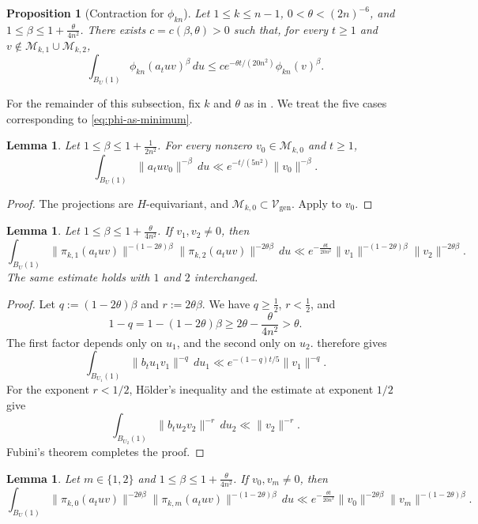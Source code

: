\documentclass[reqno,11pt]{amsart}
\numberwithin{equation}{section}
\newtheorem{lemma}[theorem]{Lemma}
\newtheorem{proposition}[theorem]{Proposition}
\theoremstyle{definition}
\theoremstyle{remark}
\newcommand{\op}{\operatorname}
\begin{document}
\begin{proposition}[Contraction for $\phi_{kn}$]
\label{prop:localMargulisineq;n-1}
Let $1\le k\le n-1$, $0<\theta<(2n)^{-6}$, and
$1\le\beta\le1+\frac{\theta}{4n^2}$.
There exists $c=c(\beta,\theta)>0$ such that, for every
$t\ge1$ and 
$v\notin\mathcal M_{k,1}\cup\mathcal M_{k,2}$,
$$
\int_{B_{U}(1)}\phi_{kn}(a_tuv)^\beta\,du
\le c e^{-\theta t/(20n^2)}\phi_{kn}(v)^\beta.
$$
\end{proposition}
 For the remainder of this subsection, fix $k$ and $\theta$ as in . We treat the five cases corresponding to
\eqref{eq:phi-as-minimum}.
\begin{lemma}
\label{lem:pi0pi0case}
Let $1\le\beta\le1+\frac1{2n^2}$. For every nonzero
$v_0\in\mathcal M_{k,0}$ and $t\ge1$,
$$
\int_{B_U(1)}\|a_tuv_0\|^{-\beta}\,du
\ll e^{-t/(5n^2)}\|v_0\|^{-\beta}.
$$
\end{lemma}

\begin{proof}
The projections are $H$-equivariant, and
$\mathcal M_{k,0}\subset\mathcal V_{\op{gen}}$. Apply
 to $v_0$.
\end{proof}

\begin{lemma}
\label{lem:pi1pi2case;n-1}
Let $1\le\beta\le1+\frac{\theta}{4n^2}$.
If $v_1,v_2\ne0$, then
$$
\int_{B_{U}(1)}
\|\pi_{k,1}(a_tuv)\|^{-(1-2\theta)\beta}
\|\pi_{k,2}(a_tuv)\|^{-2\theta\beta}\,du
\ll e^{-\frac{\theta t}{20n^2}}\|v_1\|^{-(1-2\theta)\beta}\|v_2\|^{-2\theta\beta}.
$$
The same estimate holds with $1$ and $2$ interchanged.
\end{lemma}

\begin{proof} Let
$q:=(1-2\theta)\beta$ and $r:=2\theta\beta$.
We have $q\ge\frac12$, $r<\frac12$, and
$$
1-q
=1-(1-2\theta)\beta
\ge 2\theta-\frac{\theta}{4n^2}
>\theta.
$$
The first factor depends only on $u_1$, and the second only on $u_2$.
 therefore gives
$$
\int_{B_{U_1}(1)}\|b_tu_1v_1\|^{-q}\,du_1
\ll e^{-(1-q)t /5}\|v_1\|^{-q}.
$$
For the exponent $r<1/2$, H\"older's inequality and the estimate at
exponent $1/2$ give
$$
\int_{B_{U_2}(1)}\|b_tu_2v_2\|^{-r}\,du_2
\ll\|v_2\|^{-r}.
$$
Fubini's theorem completes the proof.
\end{proof}

\begin{lemma}
\label{lem:pi0pi1case;n-1}
Let $m\in\{1,2\}$ and
$1\le\beta\le1+\frac{\theta}{4n^2}$.
If $v_0,v_m\ne0$, then
$$
\int_{B_{U}(1)}
\|\pi_{k,0}(a_tuv)\|^{-2\theta\beta}
\|\pi_{k,m}(a_tuv)\|^{-(1-2\theta)\beta}\,du
\ll e^{-\frac{\theta t}{20n^2}}\|v_0\|^{-2\theta\beta}\|v_m\|^{-(1-2\theta)\beta}.
$$
\end{lemma}
\end{document}
